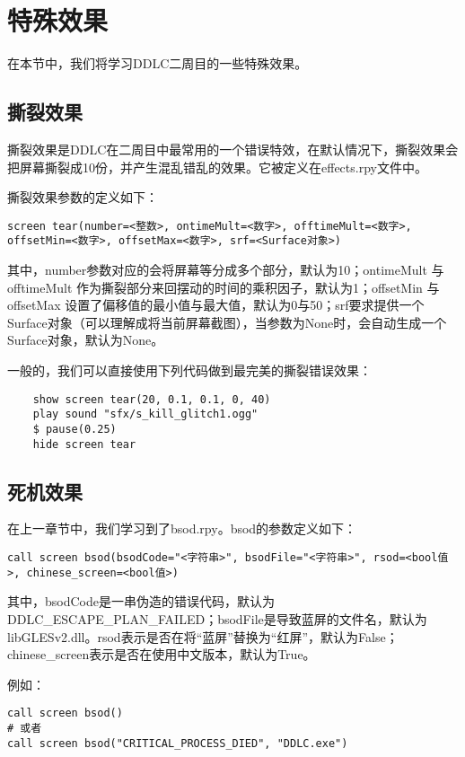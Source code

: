 \section{特殊效果}

在本节中，我们将学习DDLC二周目的一些特殊效果。

\subsection{撕裂效果}
撕裂效果是DDLC在二周目中最常用的一个错误特效，在默认情况下，撕裂效果会把屏幕撕裂成10份，并产生混乱错乱的效果。它被定义在effects.rpy文件中。

撕裂效果参数的定义如下：
\begin{lstlisting}
screen tear(number=<整数>, ontimeMult=<数字>, offtimeMult=<数字>, offsetMin=<数字>, offsetMax=<数字>, srf=<Surface对象>)
\end{lstlisting}

其中，number参数对应的会将屏幕等分成多个部分，默认为10；ontimeMult 与 offtimeMult 作为撕裂部分来回摆动的时间的乘积因子，默认为1；offsetMin 与 offsetMax 设置了偏移值的最小值与最大值，默认为0与50；srf要求提供一个Surface对象（可以理解成将当前屏幕截图），当参数为None时，会自动生成一个Surface对象，默认为None。

一般的，我们可以直接使用下列代码做到最完美的撕裂错误效果：
\begin{lstlisting}
    show screen tear(20, 0.1, 0.1, 0, 40)
    play sound "sfx/s_kill_glitch1.ogg"
    $ pause(0.25)
    hide screen tear
\end{lstlisting}

\subsection{死机效果}
在上一章节中，我们学习到了bsod.rpy。bsod的参数定义如下：

\begin{lstlisting}
call screen bsod(bsodCode="<字符串>", bsodFile="<字符串>", rsod=<bool值>, chinese_screen=<bool值>)
\end{lstlisting}

其中，bsodCode是一串伪造的错误代码，默认为DDLC\_ESCAPE\_PLAN\_FAILED；bsodFile是导致蓝屏的文件名，默认为libGLESv2.dll。rsod表示是否在将“蓝屏”替换为“红屏”，默认为False；chinese\_screen表示是否在使用中文版本，默认为True。

例如：
\begin{lstlisting}
call screen bsod()
# 或者
call screen bsod("CRITICAL_PROCESS_DIED", "DDLC.exe")
\end{lstlisting}

